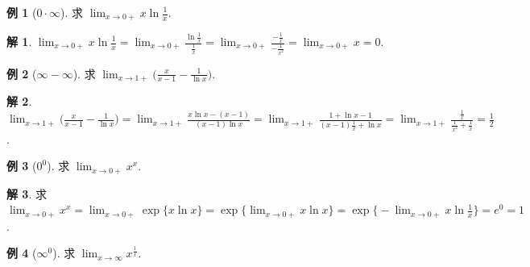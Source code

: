 \documentclass[12pt]{extarticle}
\newcommand{\ds}{\displaystyle}
\theoremstyle{definition}
\newtheorem*{ex}{例}
\newtheorem*{sol}{解}
\begin{document}
\begin{ex}[$0\cdot\infty$]
  求 $\ds\lim_{x\to 0+}x\ln\frac{1}{x}$. 
\end{ex}

\begin{sol}
  $\ds\lim_{x\to 0+}x\ln\frac{1}{x} = \lim_{x\to 0+}\frac{\ln\frac{1}{x}}{\frac{1}{x}} = \lim_{x\to 0+}\frac{-\frac{1}{x}}{-\frac{1}{x^2}} = \lim_{x\to 0+} x = 0$. 
\end{sol}

\begin{ex}[$\infty - \infty$]
  求 $\ds\lim_{x\to 1+}\Big(\frac{x}{x - 1} - \frac{1}{\ln x}\Big)$. 
\end{ex}

\begin{sol}
  $\ds\lim_{x\to 1+}\Big(\frac{x}{x - 1} - \frac{1}{\ln x}\Big) = \lim_{x\to 1+}\frac{x\ln x - (x - 1)}{(x - 1)\ln x} = \lim_{x\to 1+}\frac{1 + \ln x - 1}{(x - 1)\frac{1}{x} + \ln x} = \lim_{x\to 1+}\frac{\frac{1}{x}}{\frac{1}{x^2} + \frac{1}{x}} = \frac{1}{2}$. 
\end{sol}

\begin{ex}[$0^0$]
  求 $\ds\lim_{x\to 0+} x^x$. 
\end{ex}

\begin{sol}
  求 $\ds\lim_{x\to 0+} x^x = \lim_{x\to 0+} \exp\{x\ln x\} = \exp\big\{\lim_{x\to 0+} x\ln x\big\} = \exp\Big\{-\lim_{x\to 0+} x\ln\frac{1}{x}\Big\} = e^0 = 1$. 
\end{sol}

%

\begin{ex}[$\infty^0$]
  求 $\ds\lim_{x\to\infty} x^{\frac{1}{x}}$.  
\end{ex}
\end{document}
